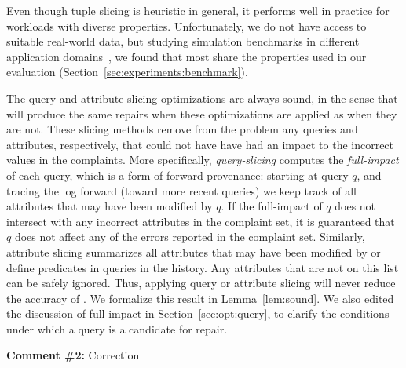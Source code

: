 Even though tuple slicing is heuristic in general, it performs well in
practice for workloads with diverse properties. Unfortunately, we do not have
access to suitable real-world data, but studying simulation benchmarks in
different application domains~\cite{oltpbench}, we found that most share the
properties used in our evaluation (Section~\ref{sec:experiments:benchmark}).



The query and attribute slicing optimizations are always sound, in the sense
that \sys will produce the same repairs when these optimizations are applied
as when they are not. These slicing methods remove from the problem any
queries and attributes, respectively, that could not have have had an impact
to the incorrect values in the complaints. More specifically,
\emph{query-slicing} computes the \emph{full-impact} of each query, which is a
form of forward provenance: starting at query $q$, and tracing the log forward
(toward more recent queries) we keep track of all attributes that may have
been modified by $q$. If the full-impact of $q$ does not intersect with any
incorrect attributes in the complaint set, it is guaranteed that $q$ does not
affect any of the errors reported in the complaint set. Similarly, attribute
slicing summarizes all attributes that may have been modified by or define
predicates in queries in the history. Any attributes that are not on this list
can be safely ignored. Thus, applying query or attribute slicing will never
reduce the accuracy of \sys. We formalize this result in
Lemma~\ref{lem:sound}. We also edited the discussion of full impact in
Section~\ref{sec:opt:query}, to clarify the conditions under which a query is
a candidate for repair.




\comskip

\noindent
\textbf{Comment \#2:} Correction
\begin{quote}
\end{quote}

